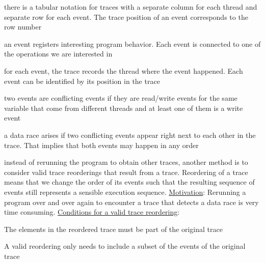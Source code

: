 \documentclass[landscape, a4paper]{article}
\begin{document}
\begin{minipage}[t]{0.2\linewidth}
\begin{betterlist}
\begin{betterlist}
			\item there is a \alert{tabular notation} for traces with a separate \alert{column} for each \alert{thread} and separate \alert{row} for each \alert{event}. The trace \alert{position} of an event corresponds to the row number
		\end{betterlist}
		\item an \alert{event} registers interesting program behavior. Each event is connected to one of the operations we are interested in
		\begin{betterlist}
			\item for each event, the trace records the \alert{thread} where the event happened. Each event can be identified by its position in the trace
			\item two events are \alert{conflicting events} if they are read/write events for the same variable that come from different threads and at least one of them is a write event
			\item a \alert{data race} arises if two conflicting events appear right next to each other in the trace. That implies that both events may happen in any order
		\end{betterlist}
		\item {}
		\item instead of rerunning the program to obtain other traces, another method is to consider \alert{valid trace reorderings} that result from a trace. Reordering of a trace means that we change the order of its events such that the resulting sequence of events still represents a sensible execution sequence. \underline{Motivation}: Rerunning a program over and over again to encounter a trace that detects a data race is very time consuming. \underline{Conditions for a valid trace reordering}:
		\begin{betterlist}
			\item The elements in the reordered trace must be part of the original trace
			\begin{betterlist}
				\item A valid reordering only needs to include a subset of the events of the original trace
			\end{betterlist}


\end{betterlist}
\end{betterlist}
\end{minipage}
\end{document}
